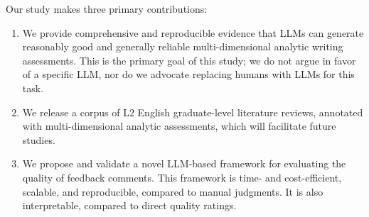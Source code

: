 \smallskip
\noindent Our study makes three primary contributions: 

\begin{enumerate}
    \item We provide comprehensive and reproducible evidence that LLMs can generate reasonably good and generally reliable multi-dimensional analytic writing assessments. This is the primary goal of this study; we do not argue in favor of a specific LLM, nor do we advocate replacing humans with LLMs for this task.
    
    \item We release a corpus of L2 English graduate-level literature reviews, annotated with multi-dimensional analytic assessments, which will facilitate future studies.
    
    \item We propose and validate a novel LLM-based framework for evaluating the quality of feedback comments. This framework is time- and cost-efficient, scalable, and reproducible, compared to manual judgments. It is also interpretable, compared to direct quality ratings. 

    
\end{enumerate}

